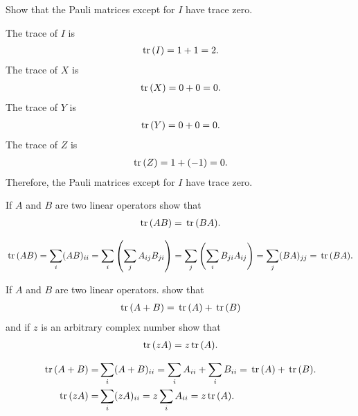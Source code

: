 \documentclass[en]{sol-man}
\begin{document}
\begin{exe}
    Show that the Pauli matrices except for $I$ have trace zero.
\end{exe}
\begin{pf}
    The trace of $I$ is
    \begin{align}
        \,\mathrm{tr}\,(I)=1+1=2.
    \end{align}
    The trace of $X$ is
    \begin{align}
        \,\mathrm{tr}\,(X)=0+0=0.
    \end{align}
    The trace of $Y$ is
    \begin{align}
        \,\mathrm{tr}\,(Y)=0+0=0.
    \end{align}
    The trace of $Z$ is
    \begin{align}
        \,\mathrm{tr}\,(Z)=1+(-1)=0.
    \end{align}
    Therefore, the Pauli matrices except for $I$ have trace zero.
\end{pf}

\begin{exe}
    If $A$ and $B$ are two linear operators show that
    \begin{align}
        \,\mathrm{tr}\,(AB)=\,\mathrm{tr}\,(BA).
    \end{align}
\end{exe}
\begin{pf}
    \begin{align}
        \,\mathrm{tr}\,(AB)=\sum_i(AB)_{ii}=\sum_i\left(\sum_jA_{ij}B_{ji}\right)=\sum_j\left(\sum_iB_{ji}A_{ij}\right)=\sum_j(BA)_{jj}=\,\mathrm{tr}\,(BA).
    \end{align}
\end{pf}

\begin{exe}
    If $A$ and $B$ are two linear operators. show that
    \begin{align}
        \,\mathrm{tr}\,(A+B)=\,\mathrm{tr}\,(A)+\,\mathrm{tr}\,(B)
    \end{align}
    and if $z$ is an arbitrary complex number show that
    \begin{align}
        \,\mathrm{tr}\,(zA)=z\,\mathrm{tr}\,(A).
    \end{align}
\end{exe}
\begin{pf}
    \begin{align}
        \,\mathrm{tr}\,(A+B)=&\sum_i(A+B)_{ii}=\sum_iA_{ii}+\sum_iB_{ii}=\,\mathrm{tr}\,(A)+\,\mathrm{tr}\,(B).\\
        \,\mathrm{tr}\,(zA)=&\sum_i(zA)_{ii}=z\sum_iA_{ii}=z\,\mathrm{tr}\,(A).
    \end{align}
\end{pf}
\end{document}
